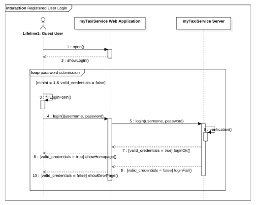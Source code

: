 				\begin{centering}
					\includegraphics[scale=0.5]{IMG/InteractionDiagrams/RegisteredUserLogin.png}
				\end{centering}